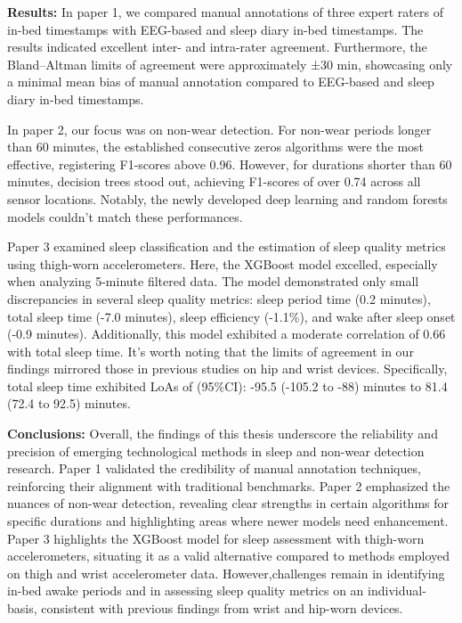 \documentclass[
  10pt,
]{scrbook}
\begin{document}
\textbf{Results:} In paper 1, we compared manual annotations of three
expert raters of in-bed timestamps with EEG-based and sleep diary in-bed
timestamps. The results indicated excellent inter- and intra-rater
agreement. Furthermore, the Bland--Altman limits of agreement were
approximately ±30 min, showcasing only a minimal mean bias of manual
annotation compared to EEG-based and sleep diary in-bed timestamps.

In paper 2, our focus was on non-wear detection. For non-wear periods
longer than 60 minutes, the established consecutive zeros algorithms
were the most effective, registering F1-scores above 0.96. However, for
durations shorter than 60 minutes, decision trees stood out, achieving
F1-scores of over 0.74 across all sensor locations. Notably, the newly
developed deep learning and random forests models couldn't match these
performances.

Paper 3 examined sleep classification and the estimation of sleep
quality metrics using thigh-worn accelerometers. Here, the XGBoost model
excelled, especially when analyzing 5-minute filtered data. The model
demonstrated only small discrepancies in several sleep quality metrics:
sleep period time (0.2 minutes), total sleep time (-7.0 minutes), sleep
efficiency (-1.1\%), and wake after sleep onset (-0.9 minutes).
Additionally, this model exhibited a moderate correlation of 0.66 with
total sleep time. It's worth noting that the limits of agreement in our
findings mirrored those in previous studies on hip and wrist devices.
Specifically, total sleep time exhibited LoAs of (95\%CI): -95.5 (-105.2
to -88) minutes to 81.4 (72.4 to 92.5) minutes.

\textbf{Conclusions:} Overall, the findings of this thesis underscore
the reliability and precision of emerging technological methods in sleep
and non-wear detection research. Paper 1 validated the credibility of
manual annotation techniques, reinforcing their alignment with
traditional benchmarks. Paper 2 emphasized the nuances of non-wear
detection, revealing clear strengths in certain algorithms for specific
durations and highlighting areas where newer models need enhancement.
Paper 3 highlights the XGBoost model for sleep assessment with
thigh-worn accelerometers, situating it as a valid alternative compared
to methods employed on thigh and wrist accelerometer data.
However,challenges remain in identifying in-bed awake periods and in
assessing sleep quality metrics on an individual-basis, consistent with
previous findings from wrist and hip-worn devices.
\end{document}
